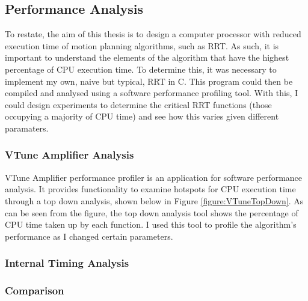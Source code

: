 \subsection{Performance Analysis}
    To restate, the aim of this thesis is to design a computer processor with reduced execution time of motion planning algorithms, such as \ac{RRT}. As such, it is important to understand the elements of the algorithm that have the highest percentage of CPU execution time. To determine this, it was necessary to implement my own, naive but typical, \ac{RRT} in C. This program could then be compiled and analysed using a software performance profiling tool. With this, I could design experiments to determine the critical RRT functions (those occupying a majority of CPU time) and see how this varies given different paramaters.

    \subsubsection{VTune Amplifier Analysis}
        VTune Amplifier performance profiler is an application for software performance analysis. It provides functionality to examine hotspots for CPU execution time through a top down analysis, shown below in Figure \ref{figure:VTuneTopDown}. As can be seen from the figure, the top down analysis tool shows the percentage of CPU time taken up by each function. I used this tool to profile the algorithm's performance as I changed certain parameters.
        

    \subsubsection{Internal Timing Analysis}

    \subsubsection{Comparison}
